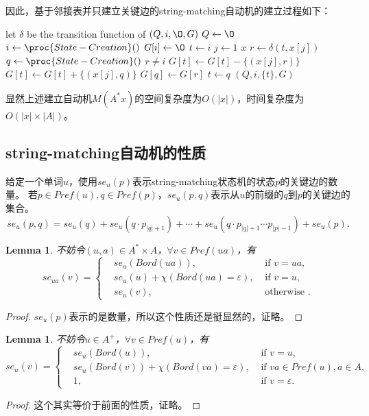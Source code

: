 \documentclass[UTF8]{ctexart}
\newtheorem{lem}[thm]{Lemma}
\theoremstyle{definition}
\theoremstyle{remark}
\numberwithin{equation}{subsection}
\begin{document}
	因此，基于邻接表并只建立关键边的string-matching自动机的建立过程如下：
    \begin{codebox}
		\zi	\Comment let $\delta$ be the transition function of $(Q, i, {\O}, G)$
		\li $Q \gets {\O}$
		\li $i \gets \proc{State-Creation}()$
		\li $G[i] \gets {\O}$
		\li $t \gets i$
		\li \For $j \gets 1$ \To $x$
		\li		\Do
					$r \gets \delta(t, x[j])$
		\li			$q \gets \proc{State-Creation}()$
		\li			\If $r \neq i$
		\li				\Then $G[t] \gets G[t] - \{(x[j], r)\}$
						\End
		\li			$G[t] \gets G[t] + \{(x[j], q)\}$
		\li			$G[q] \gets G[r]$
		\li			$t \gets q$
				\End
		\li \Return $(Q, i, \{t\}, G)$
	\end{codebox}
	
	显然上述建立自动机$M(A^*x)$的空间复杂度为$O(|x|)$，时间复杂度为$O(|x| \times |A|)$。
	
\subsection{string-matching自动机的性质}

	给定一个单词$u$，使用$se_u(p)$表示string-matching状态机的状态$p$的关键边的数量。
	若$p \in Pref(u), q \in Pref(p)$，$se_u(p,q)$表示从$u$的前缀的$q$到$p$的关键边的集合。
	\[
		se_u(p,q) = se_u(q) + se_u(q \cdot p_{|q|+1}) + \cdots + se_u(q \cdot p_{|q|+1} \cdots p_{|p|-1}) + se_u(p).
	\]
	\begin{lem}
		不妨令$(u,a) \in A^* \times A$，$\forall v \in Pref(ua)$，有
		\[
			se_{ua}(v) =
			\left\{
				\begin{aligned}
					&se_u(Bord(ua)),	&\text{ if } v = ua,	\\
					&se_u(u) + \chi(Bord(ua) = \varepsilon),	&\text{ if } v = u,	\\
					&se_u(v),			&\text{ otherwise }.
				\end{aligned}
			\right .
		\]
	\end{lem}
	\begin{proof}
		$se_u(p)$表示的是数量，所以这个性质还是挺显然的，证略。
	\end{proof}
	
	\begin{lem}
		不妨令$u \in A^+$，$\forall v \in Pref(u)$，有
		\[
			se_u(v) =
			\left\{
				\begin{aligned}
					&se_u(Bord(u)),		&\text{ if } v = u, \\
					&se_u(Bord(v)) + \chi(Bord(va) = \varepsilon),	&\text{ if } va \in Pref(u), a \in A,	\\
					&1,					&\text{ if } v = \varepsilon.
				\end{aligned}
			\right .
		\]
	\end{lem}
	\begin{proof}
		这个其实等价于前面的性质，证略。
	\end{proof}
	
\end{document}

